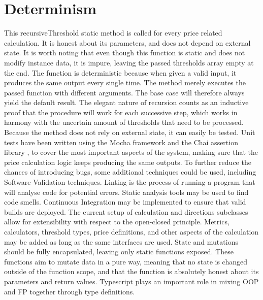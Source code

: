 \section{Determinism}
This recursiveThreshold static method is called for every price related calculation. It is honest about its parameters, and does not depend on external state. It is worth noting that even though this function is static and does not modify instance data, it is impure, leaving the passed thresholds array empty at the end. The function is deterministic because when given a valid input, it produces the same output every single time. The method merely executes the passed function with different arguments. The base case will therefore always yield the default result. The elegant nature of recursion counts as an inductive proof that the procedure will work for each successive step, which works in harmony with the uncertain amount of thresholds that need to be processed. Because the method does not rely on external state, it can easily be tested. Unit tests have been written using the Mocha framework \cite{mocha} and the Chai assertion library \cite{chai}, to cover the most important aspects of the system, making sure that the price calculation logic keeps producing the same outputs. To further reduce the chances of introducing bugs, some additional techniques could be used, including Software Validation techniques. Linting is the process of running a program that will analyse code for potential errors. Static analysis tools may be used to find code smells. Continuous Integration may be implemented to ensure that valid builds are deployed. The current setup of calculation and directions subclasses allow for extensibility with respect to the open-closed principle. Metrics, calculators, threshold types, price definitions, and other aspects of the calculation may be added as long as the same interfaces are used. State and mutations should be fully encapsulated, leaving only static functions exposed. These functions aim to mutate data in a pure way, meaning that no state is changed outside of the function scope, and that the function is absolutely honest about its parameters and return values. Typescript plays an important role in mixing OOP and FP together through type definitions.

